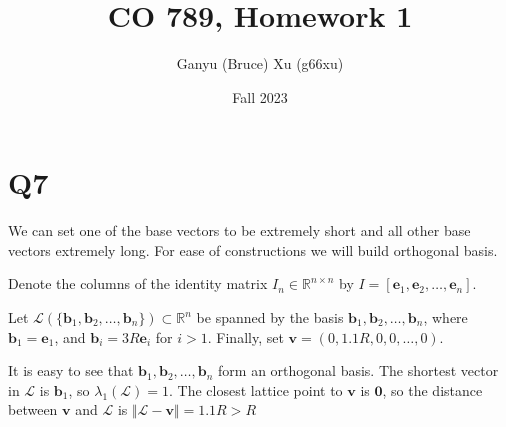 \documentclass{article}
\title{CO 789, Homework 1}
\author{Ganyu (Bruce) Xu (g66xu)}
\date{Fall 2023}
\newcommand{\norm}[1]{\Vert {#1} \Vert}
\begin{document}

\section*{Q7}
We can set one of the base vectors to be extremely short and all other base vectors extremely long. For ease of constructions we will build orthogonal basis.

Denote the columns of the identity matrix $I_n \in \mathbb{R}^{n \times n}$ by $I = [\mathbf{e}_1, \mathbf{e}_2, \ldots, \mathbf{e}_n]$.

Let $\mathcal{L}(\{\mathbf{b}_1, \mathbf{b}_2, \ldots, \mathbf{b}_n\}) \subset \mathbb{R}^n$ be spanned by the basis $\mathbf{b}_1, \mathbf{b}_2, \ldots, \mathbf{b}_n$, where $\mathbf{b}_1 = \mathbf{e}_1$, and $\mathbf{b}_i = 3R\mathbf{e}_i$ for $i > 1$. Finally, set $\mathbf{v} = (0, 1.1R, 0, 0, \ldots, 0)$.

It is easy to see that $\mathbf{b}_1, \mathbf{b}_2, \ldots, \mathbf{b}_n$ form an orthogonal basis. The shortest vector in $\mathcal{L}$ is $\mathbf{b}_1$, so $\lambda_1(\mathcal{L}) = 1$. The closest lattice point to $\mathbf{v}$ is $\mathbf{0}$, so the distance between $\mathbf{v}$ and $\mathcal{L}$ is $\norm{\mathcal{L} - \mathbf{v}} = 1.1R > R$
\end{document}
